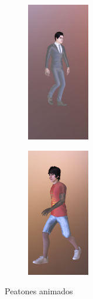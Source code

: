 \documentclass{report}
\begin{document}
\renewcommand{\figurename}{Figura}		
\begin{figure}[!h]
\centering
  \begin{subfigure}[b]{0.49\textwidth}
  \centering
    \includegraphics[width=0.3\textwidth, height=0.5\textwidth]{images/cap4/person.jpg}
    \label{fig:f1}
  \end{subfigure}
  \hfill
  \begin{subfigure}[b]{0.49\textwidth}
  \centering
    \includegraphics[width=0.3\textwidth, height=0.5\textwidth]{images/cap4/person2.jpg}
    \label{fig:f2}
  \end{subfigure}
  \caption{Peatones animados}
\end{figure}

\hfill \break
\hfill \break
\end{document}
